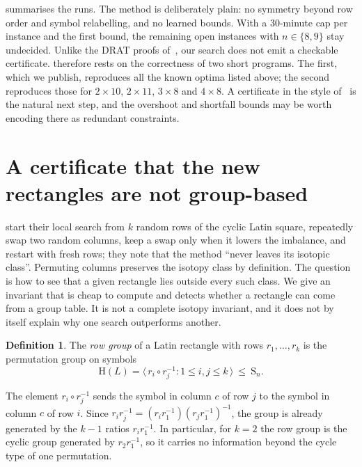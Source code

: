 \documentclass[11pt]{article}
\theoremstyle{plain}
\theoremstyle{definition}
\newtheorem{definition}[theorem]{Definition}
\theoremstyle{remark}
\newcommand{\Sym}{\mathrm{S}}
\newcommand{\row}{\mathrm{H}}
\begin{document}
 summarises the runs. The method is deliberately plain: no symmetry beyond row
order and symbol relabelling, and no learned bounds. With a 30-minute cap per instance and the first
bound, the remaining open instances with $n\in\{8,9\}$ stay undecided. Unlike
the DRAT proofs of~\citep{RamaswamySzeider2023}, our search does not emit a checkable
certificate.  therefore rests on the correctness of two short programs. The
first, which we publish, reproduces all the known optima listed above; the second reproduces those
for $2\times10$, $2\times11$, $3\times8$ and $4\times8$. A certificate in the style
of~\citep{RamaswamySzeider2023} is the natural next step, and the overshoot and shortfall bounds
may be worth encoding there as redundant constraints.

\section{A certificate that the new rectangles are not group-based}\label{sec:orbit}

\citet{DiazLeBrasGomes2017} start their local search from $k$ random rows of the cyclic Latin square,
repeatedly swap two random columns, keep a swap only when it lowers the imbalance, and restart
with fresh rows; they note that the method \textquotedblleft never leaves its isotopic class\textquotedblright. Permuting columns
preserves the isotopy class by definition. The question is how to see that a given rectangle lies
outside every such class. We give an invariant that is cheap to compute and detects whether a
rectangle can come from a group table. It is not a complete isotopy invariant, and it does not by
itself explain why one search outperforms another.

\begin{definition}
The \emph{row group} of a Latin rectangle with rows $r_1,\dots,r_k$ is the permutation group on
symbols
\[
  \row(L)=\bigl\langle\, r_i\circ r_j^{-1} : 1\le i,j\le k \,\bigr\rangle\ \le\ \Sym_n .
\]
\end{definition}

The element $r_i\circ r_j^{-1}$ sends the symbol in column $c$ of row $j$ to the symbol in column
$c$ of row $i$. Since $r_i r_j^{-1}=(r_ir_1^{-1})(r_jr_1^{-1})^{-1}$, the group is already
generated by the $k-1$ ratios $r_ir_1^{-1}$. In particular, for $k=2$ the row group is the cyclic
group generated by $r_2r_1^{-1}$, so it carries no information beyond the cycle type of one
permutation.
\end{document}
